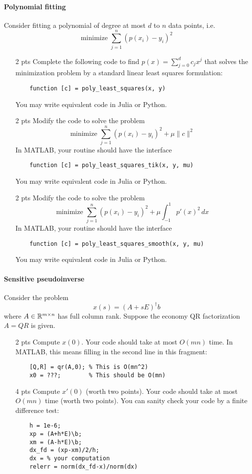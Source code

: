 \documentclass[12pt, leqno]{article} %
\begin{document}
\paragraph*{Polynomial fitting}
Consider fitting a polynomial of degree at most $d$
to $n$ data points, i.e.
\[
  \mbox{minimize } \sum_{j=1}^n (p(x_i)-y_i)^2
\]
\begin{itemize}
\item[2 pts]
  Complete the following code to find $p(x) = \sum_{j=0}^d c_j x^j$
  that solves the minimization problem by a standard
  linear least squares formulation:
  \begin{lstlisting}
    function [c] = poly_least_squares(x, y)
  \end{lstlisting}
  You may write equivalent code in Julia or Python.
\item[2 pts]
  Modify the code to solve the problem
  \[
    \mbox{minimize } \sum_{j=1}^n (p(x_i)-y_i)^2 +
    \mu \|c\|^2
  \]
  In MATLAB, your routine should have the interface
  \begin{lstlisting}
    function [c] = poly_least_squares_tik(x, y, mu)
  \end{lstlisting}
  You may write equivalent code in Julia or Python.
\item[2 pts]
  Modify the code to solve the problem
  \[
    \mbox{minimize } \sum_{j=1}^n (p(x_i)-y_i)^2 +
    \mu \int_{-1}^1 p'(x)^2 \, dx
    \]
  In MATLAB, your routine should have the interface
  \begin{lstlisting}
    function [c] = poly_least_squares_smooth(x, y, mu)
  \end{lstlisting}
  You may write equivalent code in Julia or Python.
\end{itemize}


\paragraph*{Sensitive pseudoinverse}
Consider the problem
\[
  x(s) = (A+sE)^\dagger b
\]
where $A \in \mathbb{R}^{m \times n}$ has full column rank.  Suppose
the economy QR factorization $A = QR$ is given.
\begin{itemize}
\item[2 pts]
  Compute $x(0)$.  Your code should take at most $O(mn)$ time.  In MATLAB,
  this means filling in the second line in this fragment:
  \begin{lstlisting}
    [Q,R] = qr(A,0); % This is O(mn^2)
    x0 = ???;        % This should be O(mn)
  \end{lstlisting}
\item[4 pts]
  Compute $x'(0)$ (worth two points).
  Your code should take at most $O(mn)$ time (worth two points).
  You can sanity check your code by a finite difference test:
  \begin{lstlisting}
    h = 1e-6;
    xp = (A+h*E)\b;
    xm = (A-h*E)\b;
    dx_fd = (xp-xm)/2/h;
    dx = % your computation
    relerr = norm(dx_fd-x)/norm(dx)
  \end{lstlisting}
\end{itemize}
\end{document}
